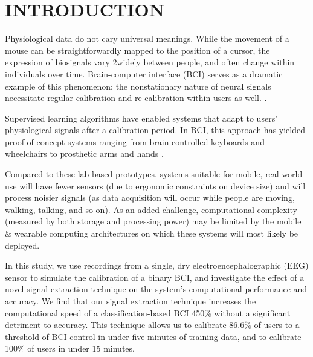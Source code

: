 \section{\uppercase{Introduction}}
\label{sec:introduction}

\noindent Physiological data do not cary universal meanings. While the movement of a mouse can be straightforwardly mapped to the position of a cursor, the expression of biosignals vary 2widely between people, and often change within individuals over time. Brain-computer interface (BCI) serves as a dramatic example of this phenomenon: the nonstationary nature of neural signals necessitate regular calibration and re-calibration within users as well. \cite{dornhege_toward_2007,mcfarland_brain-computer_2011}.

Supervised learning algorithms have enabled systems that adapt to users' physiological signals after a calibration period. In BCI, this approach has yielded proof-of-concept systems ranging from brain-controlled keyboards and wheelchairs to prosthetic arms and hands \cite{blankertz_note_2007,millan_combining_2010,d._mattia_brain_2011,hill_practical_2014,campbell_neurophone:_2010}. 




Compared to these lab-based prototypes, systems suitable for mobile, real-world use will have fewer sensors (due to ergonomic constraints on device size) and will process noisier signals (as data acquisition will occur while people are moving, walking, talking, and so on). As an added challenge, computational complexity (measured by both storage and processing power) may be limited by the mobile \& wearable computing architectures on which these systems will most likely be deployed. 

In this study, we use recordings from a single, dry electroencephalographic (EEG) sensor to simulate the calibration of a binary BCI, and investigate the effect of a novel signal extraction technique on the system's computational performance and accuracy. We find that our signal extraction technique increases the computational speed of a classification-based BCI 450\% without a significant detriment to accuracy. This technique allows us to calibrate 86.6\% of users to a threshold of BCI control in under five minutes of training data, and to calibrate 100\% of users in under 15 minutes. 